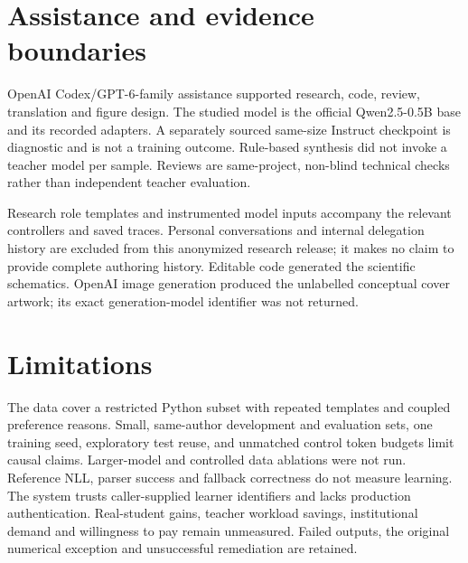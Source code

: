 \section{Assistance and evidence boundaries}
OpenAI Codex/GPT-6-family assistance supported research, code, review, translation and figure design. The studied model is the official Qwen2.5-0.5B base and its recorded adapters. A separately sourced same-size Instruct checkpoint is diagnostic and is not a training outcome. Rule-based synthesis did not invoke a teacher model per sample. Reviews are same-project, non-blind technical checks rather than independent teacher evaluation.

Research role templates and instrumented model inputs accompany the relevant controllers and saved traces. Personal conversations and internal delegation history are excluded from this anonymized research release; it makes no claim to provide complete authoring history. Editable code generated the scientific schematics. OpenAI image generation produced the unlabelled conceptual cover artwork; its exact generation-model identifier was not returned.

\section{Limitations}
The data cover a restricted Python subset with repeated templates and coupled preference reasons. Small, same-author development and evaluation sets, one training seed, exploratory test reuse, and unmatched control token budgets limit causal claims. Larger-model and controlled data ablations were not run. Reference NLL, parser success and fallback correctness do not measure learning. The system trusts caller-supplied learner identifiers and lacks production authentication. Real-student gains, teacher workload savings, institutional demand and willingness to pay remain unmeasured. Failed outputs, the original numerical exception and unsuccessful remediation are retained.
